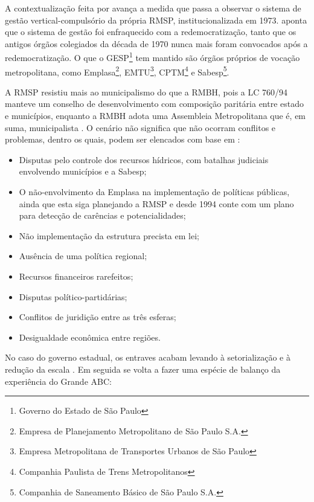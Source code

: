 \documentclass[
article,			%
11pt,				%
oneside,			%
a4paper,			%
english,			%
brazil,				%
sumario=tradicional
]{abntex2}
\begin{document}
	A contextualização feita por  avança a medida que passa a observar o sistema de gestão vertical-compulsório da própria RMSP, institucionalizada em 1973.  aponta que o sistema de gestão foi enfraquecido com a redemocratização, tanto que os antigos órgãos colegiados da década de 1970 nunca mais foram convocados após a redemocratização. O que o GESP\footnote{Governo do Estado de São Paulo} tem mantido são órgãos próprios de vocação metropolitana, como Emplasa\footnote{Empresa de Planejamento Metropolitano de São Paulo S.A.}, EMTU\footnote{Empresa Metropolitana de Transportes Urbanos de São Paulo}, CPTM\footnote{Companhia Paulista de Trens Metropolitanos} e Sabesp\footnote{Companhia de Saneamento Básico de São Paulo S.A.}.
	
	A RMSP resistiu mais ao municipalismo do que a RMBH, pois a LC 760/94 manteve um conselho de desenvolvimento com composição paritária entre estado e municípios, enquanto a RMBH adota uma Assembleia Metropolitana que é, em suma, municipalista \cite[p. 101]{machado2009}. O cenário não significa que não ocorram conflitos e problemas, dentro os quais, podem ser elencados com base em :
	
	\begin{itemize}
		\item Disputas pelo controle dos recursos hídricos, com batalhas judiciais envolvendo municípios e a Sabesp;
		\item O não-envolvimento da Emplasa na implementação de políticas públicas, ainda que esta siga planejando a RMSP e desde 1994 conte com um plano para detecção de carências e potencialidades;
		\item Não implementação da estrutura precista em lei;
		\item Ausência de uma política regional;
		\item Recursos financeiros rarefeitos;
		\item Disputas político-partidárias;
		\item Conflitos de juridição entre as três esferas;
		\item Desigualdade econômica entre regiões.
	\end{itemize}
	
	No caso do governo estadual, os entraves acabam levando à setorialização e à redução da escala \cite[p. 102]{machado2009}. Em seguida  se volta a fazer uma espécie de balanço da experiência do Grande ABC:
	
\end{document}
